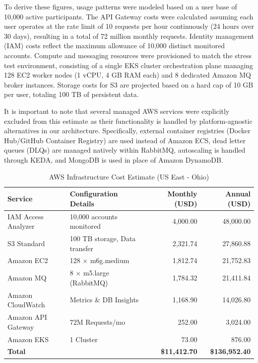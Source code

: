 To derive these figures, usage patterns were modeled based on a user base of 10,000 active participants. The API Gateway costs were calculated assuming each user operates at the rate limit of 10 requests per hour continuously (24 hours over 30 days), resulting in a total of 72 million monthly requests. Identity management (IAM) costs reflect the maximum allowance of 10,000 distinct monitored accounts. Compute and messaging resources were provisioned to match the stress test environment, consisting of a single EKS cluster orchestration plane managing 128 EC2 worker nodes (1 vCPU, 4 GB RAM each) and 8 dedicated Amazon MQ broker instances. Storage costs for S3 are projected based on a hard cap of 10 GB per user, totaling 100 TB of persistent data.

It is important to note that several managed AWS services were explicitly excluded from this estimate as their functionality is handled by platform-agnostic alternatives in our architecture. Specifically, external container registries (Docker Hub/GitHub Container Registry) are used instead of Amazon ECS, dead letter queues (DLQs) are managed natively within RabbitMQ, autoscaling is handled through KEDA, and MongoDB is used in place of Amazon DynamoDB.

\begin{table}[htbp]
    \centering
    \caption{AWS Infrastructure Cost Estimate (US East - Ohio)}
    \label{tab:aws-cost-estimate}
    \begin{tabular}{@{}llrr@{}}
        \toprule
        \textbf{Service} & \textbf{Configuration Details} & \textbf{Monthly (USD)} & \textbf{Annual (USD)} \\ 
        \midrule
        IAM Access Analyzer & 10,000 accounts monitored & 4,000.00 & 48,000.00 \\
        S3 Standard & 100 TB storage, Data transfer & 2,321.74 & 27,860.88 \\
        Amazon EC2 & 128 $\times$ m6g.medium & 1,812.74 & 21,752.83 \\
        Amazon MQ & 8 $\times$ m5.large (RabbitMQ) & 1,784.32 & 21,411.84 \\
        Amazon CloudWatch & Metrics \& DB Insights & 1,168.90 & 14,026.80 \\
        Amazon API Gateway & 72M Requests/mo & 252.00 & 3,024.00 \\
        Amazon EKS & 1 Cluster & 73.00 & 876.00 \\
        \midrule
        \textbf{Total} & & \textbf{\$11,412.70} & \textbf{\$136,952.40} \\
        \bottomrule
    \end{tabular}
\end{table}